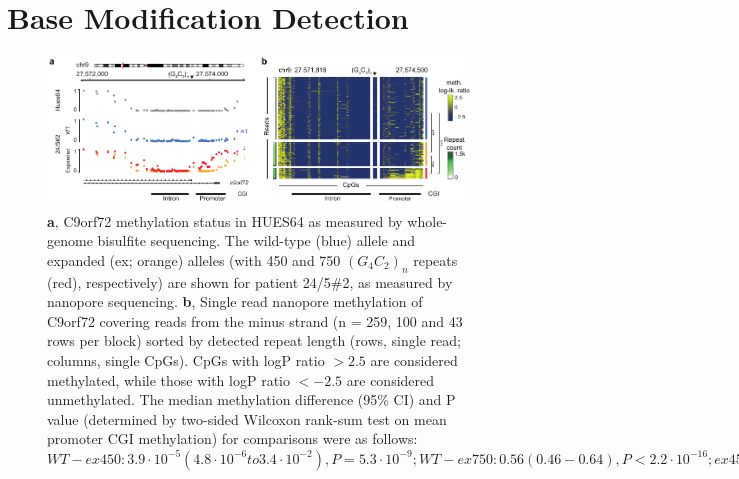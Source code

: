 \section{Base Modification Detection}
\label{sec:strique:modifications}

\begin{figure}[h]
    \centering
    \includegraphics[width=1.0\textwidth]{figures/strique/methylation_c9orf72_region.pdf}
    \captionsetup{format=plain}
    \caption[Methylation state analyses at the single-read level]{\textbf{a}, C9orf72 methylation status in HUES64 as measured by whole-genome bisulfite sequencing. The wild-type (blue) allele and expanded (ex; orange) alleles (with 450 and 750 $ (G_{4}C_{2})_{n} $ repeats (red), respectively) are shown for patient 24/5\#2, as measured by nanopore sequencing. \textbf{b}, Single read nanopore methylation of C9orf72 covering reads from the minus strand (n = 259, 100 and 43 rows per block) sorted by detected repeat length (rows, single read; columns, single CpGs). CpGs with logP ratio $> 2.5$ are considered methylated, while those with logP ratio $< -2.5$ are considered unmethylated. The median methylation difference (95\% CI) and P value (determined by two-sided Wilcoxon rank-sum test on mean promoter CGI methylation) for comparisons were as follows: $ WT-ex450: 3.9 \cdot 10^{-5} (4.8 \cdot 10^{-6} to 3.4 \cdot 10^{-2}), P = 5.3 \cdot 10^{-9}; WT-ex750: 0.56 (0.46-0.64), P < 2.2 \cdot 10^{-16}; ex450-ex750: 0.53 (0.40-0.64), P < 2.2 \cdot 10^{-16}; ***P < 0.001. $ }
    \label{fig:strique:methylation_c9orf72_region}
\end{figure}

